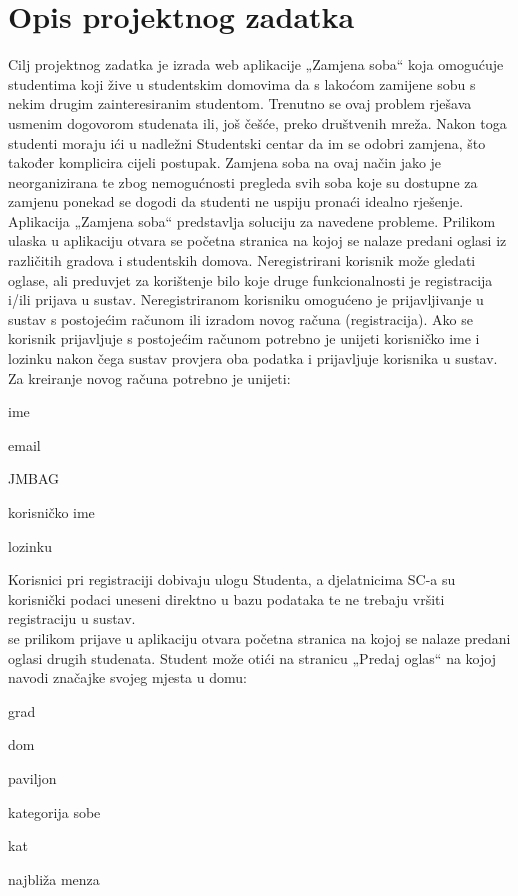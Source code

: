 \chapter{Opis projektnog zadatka}
		

Cilj projektnog zadatka je izrada web aplikacije „Zamjena soba“ koja omogućuje studentima koji žive u studentskim domovima da s lakoćom zamijene sobu s nekim drugim zainteresiranim studentom. Trenutno se ovaj problem rješava usmenim dogovorom studenata ili, još češće, preko društvenih mreža. Nakon toga studenti moraju ići u nadležni Studentski centar da im se odobri zamjena, što također komplicira cijeli postupak. Zamjena soba na ovaj način jako je neorganizirana te zbog nemogućnosti pregleda svih soba koje su dostupne za zamjenu ponekad se dogodi da studenti ne uspiju pronaći idealno rješenje.  \\
		
		Aplikacija „Zamjena soba“ predstavlja soluciju za navedene probleme. Prilikom ulaska u aplikaciju otvara se početna stranica na kojoj se nalaze predani oglasi iz različitih gradova i studentskih domova. Neregistrirani korisnik može gledati oglase, ali preduvjet za korištenje bilo koje druge funkcionalnosti je registracija i/ili prijava u sustav. Neregistriranom korisniku omogućeno je prijavljivanje u sustav s postojećim računom ili izradom novog računa (registracija). Ako se korisnik prijavljuje s postojećim računom potrebno je unijeti korisničko ime i lozinku nakon čega sustav provjera oba podatka i prijavljuje korisnika u sustav. Za kreiranje novog računa potrebno je unijeti:  
		
		\begin{packed_item}
			\item ime
			\item email
			\item JMBAG
			\item korisničko ime
			\item lozinku
		\end{packed_item}
		
		
		Korisnici pri registraciji dobivaju ulogu Studenta, a djelatnicima SC-a su korisnički podaci uneseni direktno u bazu podataka te ne trebaju vršiti registraciju u sustav. \\
		 se prilikom prijave u aplikaciju otvara početna stranica na kojoj se nalaze predani oglasi drugih studenata. Student može otići na stranicu „Predaj oglas“ na kojoj navodi značajke svojeg mjesta u domu: 
		
		\begin{packed_item}
			\item grad
			\item dom
			\item paviljon
			\item kategorija sobe
			\item kat
			\item najbliža menza
		\end{packed_item}

